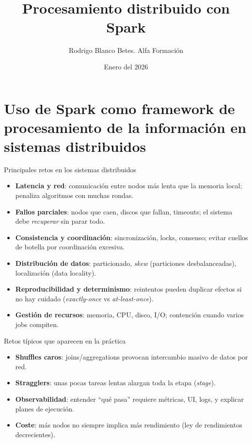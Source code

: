 \documentclass{beamer}
\title{Procesamiento distribuido con Spark}
\author{Rodrigo Blanco Betes. Alfa Formación}
\date{Enero del 2026}
\begin{document}
\begin{frame}
\titlepage
\end{frame}

\begin{frame}
\tableofcontents
\end{frame}

\section{Uso de Spark como framework de procesamiento de la información en sistemas distribuidos}


\begin{frame}{Principales retos en los sistemas distribuidos}
\begin{itemize}
  \item \textbf{Latencia y red}: comunicación entre nodos más lenta que la memoria local; penaliza algoritmos con muchas rondas.
  \item \textbf{Fallos parciales}: nodos que caen, discos que fallan, timeouts; el sistema debe \emph{recuperar} sin parar todo.
  \item \textbf{Consistencia y coordinación}: sincronización, locks, consenso; evitar cuellos de botella por coordinación excesiva.
  \item \textbf{Distribución de datos}: particionado, \emph{skew} (particiones desbalanceadas), localización (data locality).
  \item \textbf{Reproducibilidad y determinismo}: reintentos pueden duplicar efectos si no hay cuidado (\emph{exactly-once} vs \emph{at-least-once}).
  \item \textbf{Gestión de recursos}: memoria, CPU, disco, I/O; contención cuando varios jobs compiten.
\end{itemize}
\end{frame}

\begin{frame}{Retos típicos que aparecen en la práctica}
\begin{itemize}
  \item \textbf{Shuffles caros}: joins/aggregations provocan intercambio masivo de datos por red.
  \item \textbf{Stragglers}: unas pocas tareas lentas alargan toda la etapa (\emph{stage}).
  \item \textbf{Observabilidad}: entender “qué pasa” requiere métricas, UI, logs, y explicar planes de ejecución.
  \item \textbf{Coste}: más nodos no siempre implica más rendimiento (ley de rendimientos decrecientes).
\end{itemize}
\end{frame}
\end{document}
